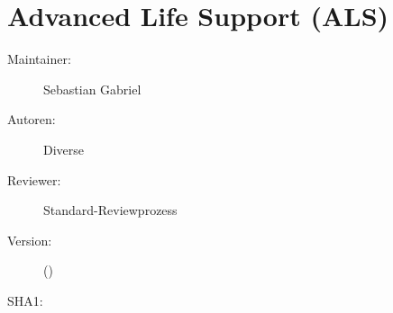 % 
\def\ChapterCode{ALS}
\chapter
[\CO{[ALS]} Advanced Life Support (ALS)]
{Advanced Life Support (ALS)}
\label{chp:ALS}

\ChapterIntro
{%
}
{%
\begin{description}
  \item[Maintainer:] Sebastian Gabriel
  \item[Autoren:] Diverse
  \item[Reviewer:] Standard-Reviewprozess
  \item[Version:] {\VarDocVersionTypeName} ({\VarDocVersionTypeDescription})
  \item[SHA1:] {\DocGitCommit}
\end{description}

{\TxTeilkapitelAASS}
}


